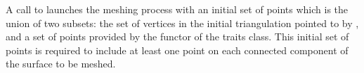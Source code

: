 A call to
 launches
the meshing process with an initial
set of points which is the union of two subsets:
the set of vertices in the  initial triangulation pointed to by ,
and a set of points provided by the  functor
of the traits class. This initial set of points is required
to include at least one point on each connected component of the surface
to be meshed.









